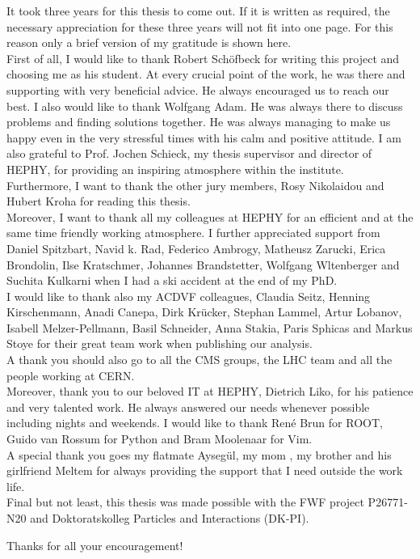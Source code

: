 \begin{acknowledgements}
It took three years for this thesis to come out. If it is written as required, the necessary appreciation for these three years will not fit into one page. For this reason only a brief version of my gratitude is shown here.\\
First of all, I would like to thank Robert Sch\"{o}fbeck for writing this project and choosing me as his student. At every crucial point of the work, he was there and supporting with very beneficial advice. He always encouraged us to reach our best. I also would like to thank Wolfgang Adam. He was always there to discuss problems and finding solutions together. He was always managing to make us happy even in the very stressful times with his calm and positive attitude. I am also grateful to Prof. Jochen Schieck, my thesis supervisor and director of HEPHY, for providing an inspiring atmosphere within the institute.\\
Furthermore, I want to thank the other jury members, Rosy Nikolaidou and Hubert Kroha for reading this thesis.\\
Moreover, I want to thank all my colleagues at HEPHY for an efficient and at the same time friendly working atmosphere. I further appreciated support from Daniel Spitzbart, Navid k. Rad, Federico Ambrogy, Matheusz Zarucki, Erica Brondolin, Ilse Kratschmer, Johannes Brandstetter, Wolfgang Wltenberger and Suchita Kulkarni when I had a ski accident at the end of my PhD.\\
I would like to thank also my ACDVF colleagues, Claudia Seitz, Henning Kirschenmann, Anadi Canepa, Dirk Kr\"{u}cker, Stephan Lammel, Artur Lobanov, Isabell Melzer-Pellmann, Basil Schneider, Anna Stakia, Paris Sphicas and Markus Stoye for their great team work when publishing our analysis.\\
A thank you should also go to all the CMS groups, the LHC team and all the people working at CERN. \\
Moreover, thank you to our beloved IT at HEPHY, Dietrich Liko, for his patience and very talented work. He always answered our needs whenever possible including nights and weekends. I would like to thank Ren\'{e} Brun for ROOT, Guido van Rossum for Python and Bram Moolenaar for Vim.\\
A special thank you goes my flatmate Ayseg\"{u}l, my mom , my brother and his girlfriend Meltem for always providing the support that I need outside the work life.\\
Final but not least, this thesis was made possible with the FWF project P26771-N20 and Doktoratskolleg Particles and Interactions (DK-PI).

Thanks for all your encouragement!

\end{acknowledgements}
